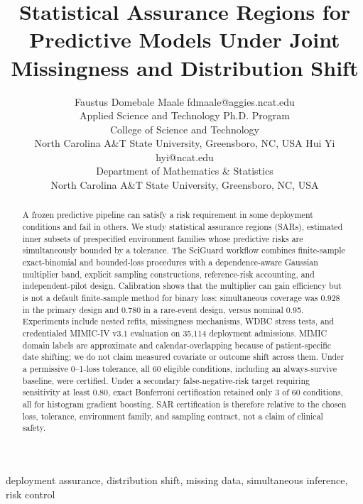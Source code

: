 \documentclass[twoside,11pt]{article}
\begin{document}
\title{Statistical Assurance Regions for Predictive Models Under Joint Missingness and Distribution Shift}
\author{\name Faustus Domebale Maale \email fdmaale@aggies.ncat.edu \\
\addr Applied Science and Technology Ph.D. Program\\
College of Science and Technology\\
North Carolina A\&T State University, Greensboro, NC, USA
\AND
\name Hui Yi \email hyi@ncat.edu \\
\addr Department of Mathematics \& Statistics\\
North Carolina A\&T State University, Greensboro, NC, USA}
\editor{}
\maketitle

\begin{abstract}
A frozen predictive pipeline can satisfy a risk requirement in some deployment conditions
and fail in others. We study statistical assurance regions (SARs), estimated inner subsets
of prespecified environment families whose predictive risks are simultaneously bounded by a
tolerance. The SciGuard workflow combines finite-sample exact-binomial and bounded-loss
procedures with a dependence-aware Gaussian multiplier band, explicit sampling constructions,
reference-risk accounting, and independent-pilot design. Calibration shows that the multiplier
can gain efficiency but is not a default finite-sample method for binary loss: simultaneous
coverage was 0.928 in the primary design and 0.780 in a rare-event design, versus nominal 0.95.
Experiments include nested refits, missingness mechanisms, WDBC stress tests, and credentialed
MIMIC-IV v3.1 evaluation on 35,114 deployment admissions. MIMIC domain labels are approximate
and calendar-overlapping because of patient-specific date shifting; we do not claim measured
covariate or outcome shift across them. Under a permissive 0--1-loss tolerance, all 60 eligible
conditions, including an always-survive baseline, were certified. Under a secondary
false-negative-risk target requiring sensitivity at least 0.80, exact Bonferroni certification
retained only 3 of 60 conditions, all for histogram gradient boosting. SAR certification is
therefore relative to the chosen loss, tolerance, environment family, and sampling contract,
not a claim of clinical safety.
\end{abstract}
\begin{keywords}
deployment assurance, distribution shift, missing data, simultaneous inference, risk control
\end{keywords}
\end{document}
